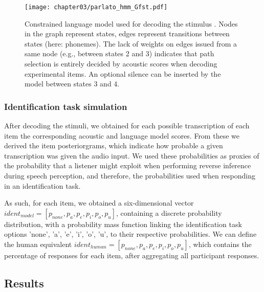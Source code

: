 \begin{figure}[htb]
\centering
\texttt{[image: chapter03/parlato\_hmm\_Gfst.pdf]}
\caption{Constrained language model used for decoding the stimulus . Nodes in the graph represent states, edges represent transitions between states (here: phonemes). The lack of weights on edges issued from a same node (e.g., between states 2 and 3) indicates that path selection is entirely decided by acoustic scores when decoding experimental items. An optional silence can be inserted by the model between states 3 and 4.}
\label{fig:parlato_G}
\end{figure}

\subsubsection{Identification task simulation}
After decoding the stimuli, we obtained for each possible transcription of each item the corresponding acoustic and language model scores. From these we derived the item posteriorgrams, which indicate how probable a given transcription was given the audio input. We used these probabilities as proxies of the probability that a listener might exploit when performing reverse inference during speech perception, and therefore, the probabilities used when responding in an identification task. 

As such, for each item, we obtained a six-dimensional vector $ident_{model} = [p_{none}, p_{a}, p_{e}, p_{i}, p_{o}, p_{u}]$, containing a discrete probability distribution, with a probability mass function linking the identification task options 'none', 'a', 'e', 'i', 'o', 'u', to their respective probabilities.
We can define the human equivalent $ident_{human} = [p_{none}, p_{a}, p_{e}, p_{i}, p_{o}, p_{u}]$, which contains the percentage of responses for each item, after aggregating all participant responses. 

\subsection{Results}
